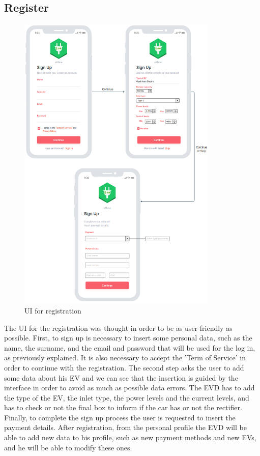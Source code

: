\subsection{Register}
\begin{figure}[H]
    \centering
    \includegraphics[width=0.85\textwidth]{Images/cp3/registerMockup.png}
    \caption{UI for registration}
\end{figure}
The UI for the registration was thought in order to be as user-friendly as possible. First, to sign up is necessary to insert some personal data, such as the name, the surname, and the email and password that will be used for the log in, as previously explained. It is also necessary to accept the 'Term of Service' in order to continue with the registration. The second step asks the user to add some data about his EV and we can see that the insertion is guided by the interface in order to avoid as much as possible data errors. The EVD has to add the type of the EV, the inlet type, the power levels and the current levels, and has to check or not the final box to inform if the car has or not the rectifier. Finally, to complete the sign up process the user is requested to insert the payment details. After registration, from the personal profile the EVD will be able to add new data to his profile, such as new payment methods and new EVs, and he will be able to modify these ones.

